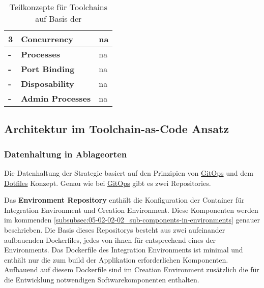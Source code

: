 \begin{table}[H]
\begin{tabular}{ | >{\bfseries}p{} | >{\raggedright\bfseries}p{} | >{}p{} | }
            3
            & %
            Concurrency
            & \acrshort{na} \\
        \hline
            -
            & %
            Processes
            & \acrshort{na} \\
        \hline
            -
            & %
            Port Binding
            & \acrshort{na} \\
        \hline
            -
            & %
            Disposability
            & \acrshort{na} \\
        \hline
            -
            & %
            Admin Processes
            & \acrshort{na} \\
        \hline
    \end{tabular}
    \caption{Teilkonzepte für Toolchains auf Basis der }
    \label{tab:concepts-factors}
\end{table}
\setcounter{factorno}{0}

\subsection{Architektur im Toolchain-as-Code Ansatz}
\label{subsec:05-02-02_architecture-in-the-toolchain-as-code-approach}

\subsubsection{Datenhaltung in Ablageorten}
\label{subsubsec:05-02-02-01_data-storage-in-repositories}

Die Datenhaltung der  Strategie basiert auf den Prinzipien von \hyperref[sec:03-03_gitops]{GitOps} und dem \hyperref[sec:03-04_dotfiles]{Dotfiles} Konzept. Genau wie bei \hyperref[sec:03-03_gitops]{GitOps} gibt es zwei Repositories.

Das \textbf{Environment Repository} enthält die Konfiguration der Container für Integration Environment und Creation Environment. Diese Komponenten werden im kommenden \autoref{subsubsec:05-02-02-02_sub-components-in-environments} genauer beschrieben. Die Basis dieses Repositorys besteht aus zwei aufeinander aufbauenden Dockerfiles, jedes von ihnen für entsprechend eines der Environments. Das Dockerfile des Integration Environments ist minimal und enthält nur die zum \Gls{build} der Applikation erforderlichen Komponenten. Aufbauend auf diesem Dockerfile sind im Creation Environment zusätzlich die für die Entwicklung notwendigen Softwarekomponenten enthalten.

